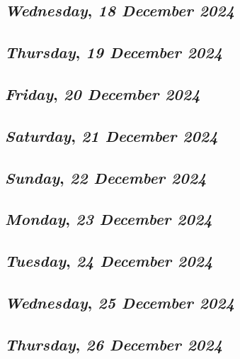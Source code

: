 \def\day{\textit{18 December 2024}}
\def\weekday{\textit{Wednesday}}
\subsection*{\weekday, \day}

\def\day{\textit{19 December 2024}}
\def\weekday{\textit{Thursday}}
\subsection*{\weekday, \day}

\def\day{\textit{20 December 2024}}
\def\weekday{\textit{Friday}}
\subsection*{\weekday, \day}

\def\day{\textit{21 December 2024}}
\def\weekday{\textit{Saturday}}
\subsection*{\weekday, \day}

\def\day{\textit{22 December 2024}}
\def\weekday{\textit{Sunday}}
\subsection*{\weekday, \day}

\def\day{\textit{23 December 2024}}
\def\weekday{\textit{Monday}}
\subsection*{\weekday, \day}

\def\day{\textit{24 December 2024}}
\def\weekday{\textit{Tuesday}}
\subsection*{\weekday, \day}

\def\day{\textit{25 December 2024}}
\def\weekday{\textit{Wednesday}}
\subsection*{\weekday, \day}

\def\day{\textit{26 December 2024}}
\def\weekday{\textit{Thursday}}
\subsection*{\weekday, \day}

